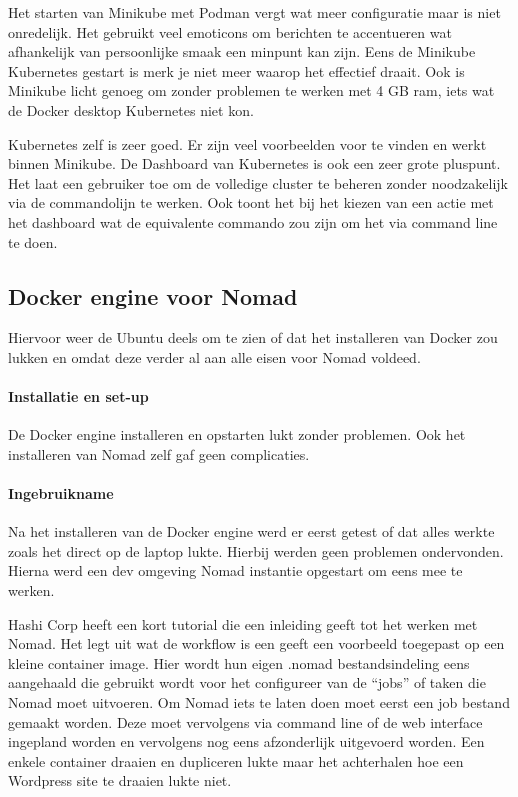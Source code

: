 \begin{itemize}
Het starten van Minikube met Podman vergt wat meer configuratie maar is niet onredelijk. Het gebruikt veel emoticons om berichten te accentueren wat afhankelijk van persoonlijke smaak een minpunt kan zijn. Eens de Minikube Kubernetes gestart is merk je niet meer waarop het effectief draait. Ook is Minikube licht genoeg om zonder problemen te werken met 4 GB ram, iets wat de Docker desktop Kubernetes niet kon.

Kubernetes zelf is zeer goed. Er zijn veel voorbeelden voor te vinden en werkt binnen Minikube. De Dashboard van Kubernetes is ook een zeer grote pluspunt. Het laat een gebruiker toe om de volledige cluster te beheren zonder noodzakelijk via de commandolijn te werken. Ook toont het bij het kiezen van een actie met het dashboard wat de equivalente commando zou zijn om het via command line te doen.


\subsection{Docker engine voor Nomad}
Hiervoor weer de Ubuntu deels om te zien of dat het installeren van Docker zou lukken en omdat deze verder al aan alle eisen voor Nomad voldeed.
\paragraph{Installatie en set-up}
De Docker engine installeren en opstarten lukt zonder problemen. Ook het installeren van Nomad zelf gaf geen complicaties.
\paragraph{Ingebruikname}
Na het installeren van de Docker engine werd er eerst getest of dat alles  werkte zoals het direct op de laptop lukte. Hierbij werden geen problemen ondervonden. Hierna werd een dev omgeving Nomad instantie opgestart om eens mee te werken.

Hashi Corp heeft een kort tutorial die een inleiding geeft tot het werken met Nomad. Het legt uit wat de workflow is een geeft een voorbeeld toegepast op een kleine container image.  Hier wordt hun eigen .nomad bestandsindeling eens aangehaald die gebruikt wordt voor het configureer van de “jobs” of taken die Nomad moet uitvoeren. Om Nomad iets te laten doen moet eerst een job bestand gemaakt worden. Deze moet vervolgens via command line of de web interface ingepland worden en vervolgens nog eens afzonderlijk uitgevoerd worden. Een enkele container draaien en dupliceren lukte maar het achterhalen hoe een Wordpress site te draaien lukte niet.


\end{itemize}
